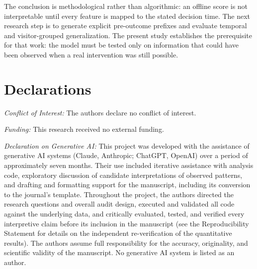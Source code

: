 \documentclass[conference, letterpaper]{IEEEtran}
\begin{document}
The conclusion is methodological rather than algorithmic: an offline score is not interpretable until every feature is mapped to the stated decision time. The next research step is to generate explicit pre-outcome prefixes and evaluate temporal and visitor-grouped generalization. The present study establishes the prerequisite for that work: the model must be tested only on information that could have been observed when a real intervention was still possible.

\section*{Declarations}
\textit{Conflict of Interest:} The authors declare no conflict of interest.

\textit{Funding:} This research received no external funding.

\textit{Declaration on Generative AI:} This project was developed with the assistance of generative AI systems (Claude, Anthropic; ChatGPT, OpenAI) over a period of approximately seven months. Their use included iterative assistance with analysis code, exploratory discussion of candidate interpretations of observed patterns, and drafting and formatting support for the manuscript, including its conversion to the journal's template. Throughout the project, the authors directed the research questions and overall audit design, executed and validated all code against the underlying data, and critically evaluated, tested, and verified every interpretive claim before its inclusion in the manuscript (see the Reproducibility Statement for details on the independent re-verification of the quantitative results). The authors assume full responsibility for the accuracy, originality, and scientific validity of the manuscript. No generative AI system is listed as an author.



\end{document}
